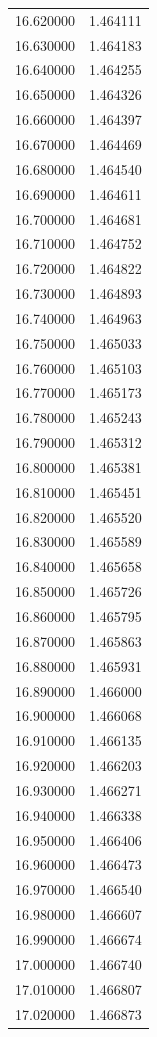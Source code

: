 \begin{tabular}{rr}
16.620000 & 1.464111 \\
16.630000 & 1.464183 \\
16.640000 & 1.464255 \\
16.650000 & 1.464326 \\
16.660000 & 1.464397 \\
16.670000 & 1.464469 \\
16.680000 & 1.464540 \\
16.690000 & 1.464611 \\
16.700000 & 1.464681 \\
16.710000 & 1.464752 \\
16.720000 & 1.464822 \\
16.730000 & 1.464893 \\
16.740000 & 1.464963 \\
16.750000 & 1.465033 \\
16.760000 & 1.465103 \\
16.770000 & 1.465173 \\
16.780000 & 1.465243 \\
16.790000 & 1.465312 \\
16.800000 & 1.465381 \\
16.810000 & 1.465451 \\
16.820000 & 1.465520 \\
16.830000 & 1.465589 \\
16.840000 & 1.465658 \\
16.850000 & 1.465726 \\
16.860000 & 1.465795 \\
16.870000 & 1.465863 \\
16.880000 & 1.465931 \\
16.890000 & 1.466000 \\
16.900000 & 1.466068 \\
16.910000 & 1.466135 \\
16.920000 & 1.466203 \\
16.930000 & 1.466271 \\
16.940000 & 1.466338 \\
16.950000 & 1.466406 \\
16.960000 & 1.466473 \\
16.970000 & 1.466540 \\
16.980000 & 1.466607 \\
16.990000 & 1.466674 \\
17.000000 & 1.466740 \\
17.010000 & 1.466807 \\
17.020000 & 1.466873 \\

\end{tabular}
